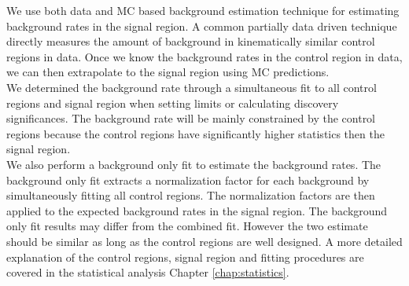 \indent We use both data and MC based background estimation technique for estimating background rates in the signal region.  A common partially data driven technique directly measures the amount of background in kinematically similar control regions in data.  Once we know the background rates in the control region in data, we can then extrapolate to the signal region using MC predictions. \\

\indent We determined the background rate through a simultaneous fit to all control regions and signal region when setting limits or calculating discovery significances.  The background rate will be mainly constrained by the control regions because the control regions have significantly higher statistics then the signal region.  \\

\indent We also perform a background only fit to estimate the background rates.  The background only fit extracts a normalization factor for each background by simultaneously fitting all control regions.  The normalization factors are then applied to the expected background rates in the signal region.  The background only fit results may differ from the combined fit. However the two estimate should be similar as long as the control regions are well designed.   A more detailed explanation of the control regions, signal region and fitting procedures are covered in the statistical analysis Chapter \ref{chap:statistics}.  \\




